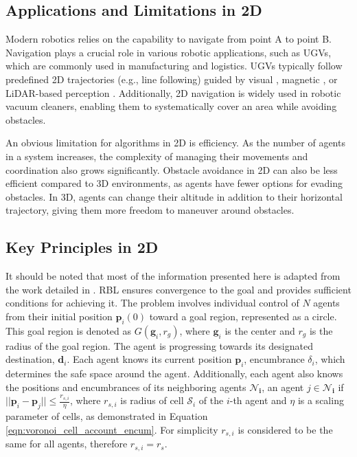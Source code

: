     \subsection{Applications and Limitations in 2D}
        Modern robotics relies on the capability to navigate from point A to point B.
        Navigation plays a crucial role in various robotic applications, such as \ac{UGV}s, which are commonly used in manufacturing and logistics. 
        \ac{UGV}s typically follow predefined 2D trajectories (e.g., line following) guided by visual \cite{vision_navigation}, magnetic \cite{magnetic_navigation}, or \ac{LiDAR}-based perception \cite{lidar_navigation}. 
        Additionally, 2D navigation is widely used in robotic vacuum cleaners, enabling them to systematically cover an area while avoiding obstacles.

        An obvious limitation for algorithms in 2D is efficiency. 
        As the number of agents in a system increases, the complexity of managing their movements and coordination also grows significantly.
        Obstacle avoidance in 2D can also be less efficient compared to 3D environments, as agents have fewer options for evading obstacles. 
        In 3D, agents can change their altitude in addition to their horizontal trajectory, giving them more freedom to maneuver around obstacles.

    \subsection{Key Principles in 2D}
        It should be noted that most of the information presented here is adapted from the work detailed in \cite{rbl_paper}.
        RBL ensures convergence to the goal and provides sufficient conditions for achieving it. 
        The problem involves individual control of $N$ agents from their initial position $\mathbf{p}_i(0)$ toward a goal region, represented as a circle.
        This goal region is denoted as $G(\mathbf{g}_i, r_g)$, where $\mathbf{g}_i$ is the center and $r_g$ is the radius of the goal region. 
        The agent is progressing towards its designated destination, $\mathbf{d}_i$.
        Each agent knows its current position $\mathbf{p}_i$, encumbrance $\delta_i$, which determines the safe space around the agent.
        Additionally, each agent also knows the positions and encumbrances of its neighboring agents $\mathbf{\mathcal{N}_i}$, an agent $j \in \mathbf{\mathcal{N}_i}$ if $||\mathbf{p}_i - \mathbf{p}_j|| \leq \frac{r_{s,i}}{\eta}$, where $r_{s,i}$ is radius of cell $\mathcal{S}_i$ of the $i$-th agent and $\eta$ is a scaling parameter of cells, as demonstrated in Equation \eqref{eqn:voronoi_cell_account_encum}.
        For simplicity $r_{s,i}$ is considered to be the same for all agents, therefore $r_{s,i} = r_s$. 

